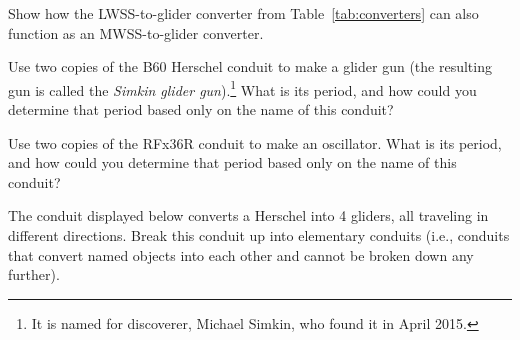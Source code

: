 \begin{multicols}{2}
\begin{problem}
	\end{problem}
	
	
	\mfilbreak
	
	
	\begin{problem}\label{exer:mwss_to_g}
		Show how the LWSS-to-glider converter from Table~\ref{tab:converters} can also function as an MWSS-to-glider converter.
	\end{problem}
	
	
	\mfilbreak
	
	
	\begin{problem}\label{exer:simkin_glider_gun}
		Use two copies of the B60 Herschel conduit to make a glider gun (the resulting gun is called the \emph{Simkin glider gun}).\footnote{It is named for discoverer, Michael Simkin, who found it in April 2015.} What is its period, and how could you determine that period based only on the name of this conduit?
	\end{problem}
	
	
	\mfilbreak
	
	
	\begin{problem}\label{exer:RFx36R_osc}
		Use two copies of the RFx36R conduit to make an oscillator. What is its period, and how could you determine that period based only on the name of this conduit?
	\end{problem}
	
	
	\mfilbreak
	
	
	\begin{problem}\label{exer:H_to_4G}
		The conduit displayed below converts a Herschel into 4 gliders, all traveling in different directions. Break this conduit up into elementary conduits (i.e., conduits that convert named objects into each other and cannot be broken down any further).
		
		\begin{center}
		\end{center}
		
	\end{problem}
	

\end{multicols}
